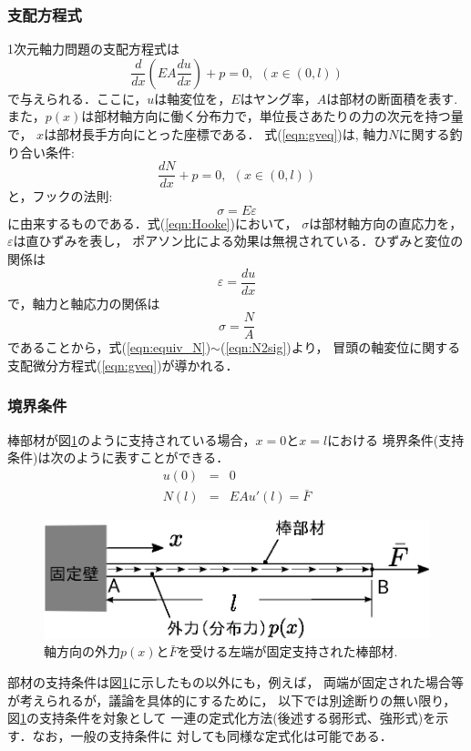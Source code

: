 \documentclass[10pt,a4j]{jarticle}
\begin{document}
\subsubsection{支配方程式}
1次元軸力問題の支配方程式は
\begin{equation}
	\frac{d}{dx}\left(EA \frac{du}{dx}\right) + p =0, \ \ \left(x\in (0,l)\right)
	\label{eqn:gveq}
\end{equation}
で与えられる．ここに，$u$は軸変位を，$E$はヤング率，$A$は部材の断面積を表す.
また，$p(x)$は部材軸方向に働く分布力で，単位長さあたりの力の次元を持つ量で，
$x$は部材長手方向にとった座標である．
式(\ref{eqn:gveq})は, 軸力$N$に関する釣り合い条件:
\begin{equation}
	\frac{dN}{dx}+p=0, \ \ \left(x\in (0,l)\right)
	\label{eqn:equiv_N}
\end{equation}
と，フックの法則:
\begin{equation}
	\sigma=E\varepsilon
	\label{eqn:Hooke}
\end{equation}
に由来するものである．式(\ref{eqn:Hooke})において，
$\sigma$は部材軸方向の直応力を，$\varepsilon$は直ひずみを表し，
ポアソン比による効果は無視されている．ひずみと変位の関係は
\begin{equation}
	\varepsilon = \frac{du}{dx}
	\label{eqn:dudx}
\end{equation}
で，軸力と軸応力の関係は
\begin{equation}
	\sigma=\frac{N}{A}
	\label{eqn:N2sig}
\end{equation}
であることから，式(\ref{eqn:equiv_N})$\sim$(\ref{eqn:N2sig})より，
冒頭の軸変位に関する支配微分方程式(\ref{eqn:gveq})が導かれる．
\subsubsection{境界条件}
棒部材が図\ref{fig:fig1_1}のように支持されている場合，$x=0$と$x=l$における
境界条件(支持条件)は次のように表すことができる．
\begin{eqnarray}
	u (0) &= & 0 
	\label{eqn:BC_u}
	\\
	N (l) &= & EA u'(l)=\bar F 
	\label{eqn:BC_N}
\end{eqnarray}
\begin{figure}[h]
	\begin{center}
	\includegraphics[width=0.4\linewidth]{fig1_1.eps} 
	\end{center}
	\caption{軸方向の外力$p(x)$と$\bar F$を受ける左端が固定支持された棒部材.} 
	\label{fig:fig1_1}
\end{figure}
部材の支持条件は図\ref{fig:fig1_1}に示したもの以外にも，例えば，
両端が固定された場合等が考えられるが，議論を具体的にするために，
以下では別途断りの無い限り， 図\ref{fig:fig1_1}の支持条件を対象として
一連の定式化方法(後述する弱形式、強形式)を示す．なお，一般の支持条件に
対しても同様な定式化は可能である．
\end{document}
